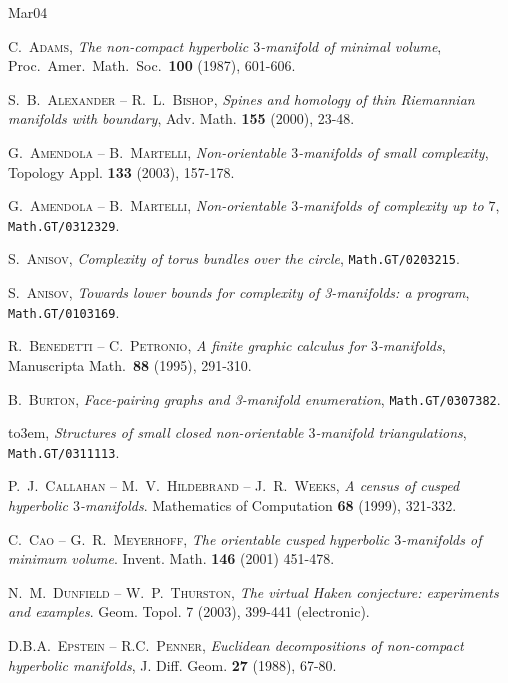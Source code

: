 \documentclass[10pt]{article}      %
\begin{document}
\begin{thebibliography}{Mar04}

\newcommand{\bysame}{\leavevmode\hbox to3em{\hrulefill}\thinspace}

 \textsc{C.~Adams},
  \emph{The non-compact hyperbolic $3$-manifold of minimal volume},
  Proc.~Amer.~Math.~Soc.~\textbf{100} (1987), 601-606.

 \textsc{S.~B.~Alexander -- R.~L.~Bishop},
\emph{Spines and homology of thin Riemannian manifolds with boundary}, 
Adv. Math. \textbf{155} (2000), 23-48.

 \textsc{G.~Amendola -- B.~Martelli},
  \emph{Non-orientable $3$-manifolds of small complexity},
  Topology Appl. \textbf{133} (2003), 157-178.

 \textsc{G.~Amendola -- B.~Martelli},
  \emph{Non-orientable $3$-manifolds of complexity up to $7$},
       {\tt Math.GT/0312329}.

 \textsc{S.~Anisov},
  \emph{Complexity of torus bundles over the circle},
       {\tt Math.GT/0203215}.

 \textsc{S.~Anisov},
  \emph{Towards lower bounds for complexity of 3-manifolds: a program},
       {\tt Math.GT/0103169}.

 \textsc{R.~Benedetti -- C.~Petronio}, \emph{A finite
graphic calculus for $3$-manifolds}, Manuscripta Math.~\textbf{88} (1995),
291-310.

 \textsc{B.~Burton},
  \emph{Face-pairing graphs and 3-manifold enumeration},
	{\tt Math.GT/0307382}.

 \bysame,
  \emph{Structures of small closed non-orientable $3$-manifold triangulations},
  {\tt Math.GT/0311113}.

 \textsc{P.~J.~Callahan -- M.~V.~Hildebrand --
J.~R.~Weeks}, \emph{A census of cusped hyperbolic $3$-manifolds}.
Mathematics of Computation \textbf{68} (1999), 321-332.

 \textsc{C.~Cao -- G.~R.~Meyerhoff},
\emph{The orientable cusped hyperbolic $3$-manifolds of minimum volume}.  
Invent. Math.  \textbf{146}  (2001)  451-478.

 \textsc{N.~M.~Dunfield -- W.~P.~Thurston}, 
\emph{The virtual Haken conjecture: experiments and examples}.  
Geom. Topol.  7  (2003), 399-441 (electronic).

 \textsc{D.B.A.~Epstein -- R.C.~Penner}, \emph{Euclidean
decompositions of non-compact hyperbolic manifolds},
J. Diff. Geom. \textbf{27} (1988), 67-80.


\end{thebibliography}
\end{document}
